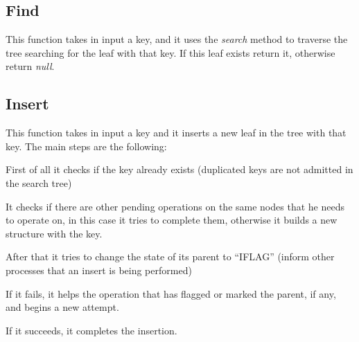 \documentclass[a4paper]{article}
\begin{document}
\subsection{Find}
This function takes in input a key, and it uses the \emph{search} method to traverse the tree searching for the leaf with that key. If this leaf exists return it, otherwise return \emph{null}.

\subsection{Insert}
This function takes in input a key and it inserts a new leaf in the tree with that key. The main steps are the following:
\begin{compactitem}
  \item First of all it checks if the key already exists (duplicated keys are not admitted in the search tree)
  \item It checks if there are other pending operations on the same nodes that he needs to operate on, in this case it tries to complete them, otherwise it builds a new structure with the key. 
  \item After that it tries to change the state of its parent to ``IFLAG'' (inform other processes that an insert is being performed)
  \begin{compactitem}
    \item If it fails, it helps the operation that has flagged or marked the parent, if any, and begins a new attempt.
    \item If it succeeds, it completes the insertion.
  \end{compactitem}
\end{compactitem}
\end{document}
